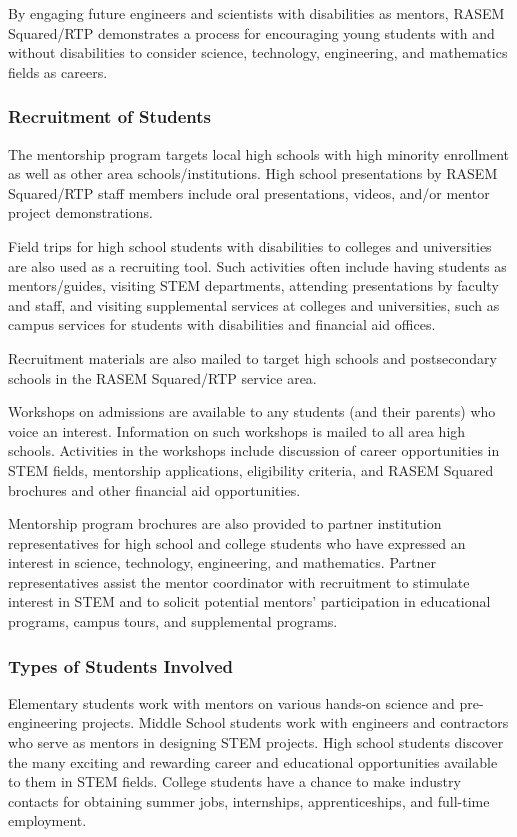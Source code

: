 \documentclass[11.5pt]{sig-alternate} %
\begin{document}
\begin{large}
By engaging future engineers and scientists with disabilities as mentors, RASEM Squared/RTP demonstrates a process for encouraging young students with and without disabilities to consider science, technology, engineering, and mathematics fields as careers.

\subsubsection*{Recruitment of Students}
The mentorship program targets local high schools with high minority enrollment as well as other area schools/institutions. High school presentations by RASEM Squared/RTP staff members include oral presentations, videos, and/or mentor project demonstrations.

Field trips for high school students with disabilities to colleges and universities are also used as a recruiting tool. Such activities often include having students as mentors/guides, visiting STEM departments, attending presentations by faculty and staff, and visiting supplemental services at colleges and universities, such as campus services for students with disabilities and financial aid offices. 

Recruitment materials are also mailed to target high schools and postsecondary schools in the RASEM Squared/RTP service area.

Workshops on admissions are available to any students (and their parents) who voice an interest. Information on such workshops is mailed to all area high schools. Activities in the workshops include discussion of career opportunities in STEM fields, mentorship applications, eligibility criteria, and RASEM Squared brochures and other financial aid opportunities.

Mentorship program brochures are also provided to partner institution representatives for high school and college students who have expressed an interest in science, technology, engineering, and mathematics. Partner representatives assist the mentor coordinator with recruitment to stimulate interest in STEM and to solicit potential mentors' participation in educational programs, campus tours, and supplemental programs.

\subsubsection*{Types of Students Involved}
Elementary students work with mentors on various hands-on science and pre-engineering projects. Middle School students work with engineers and contractors who serve as mentors in designing STEM projects. High school students discover the many exciting and rewarding career and educational opportunities available to them in STEM fields. College students have a chance to make industry contacts for obtaining summer jobs, internships, apprenticeships, and full-time employment.


\end{large}
\end{document}
